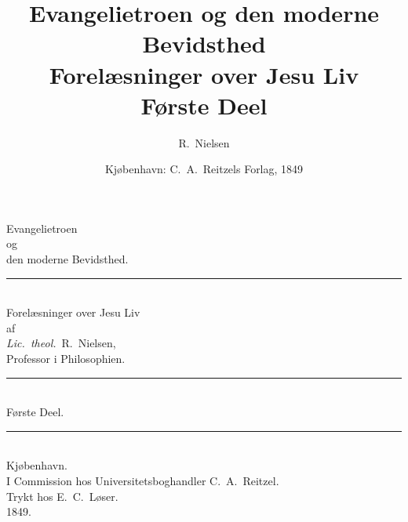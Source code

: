 \documentclass[12pt,a4paper]{book}
\title{\textbf{Evangelietroen og den moderne Bevidsthed}\\[6pt]
  \large Forelæsninger over Jesu Liv\\[4pt]
  \large Første Deel}
\author{R.\ Nielsen}
\date{Kjøbenhavn: C.\ A.\ Reitzels Forlag, 1849}
\begin{document}
\maketitle
\thispagestyle{empty}
\newpage

\tableofcontents
\newpage



\begin{center}
  {\LARGE Evangelietroen}\\[10pt]
  og\\[10pt]
  {\LARGE den moderne Bevidsthed.}\\[12pt]
  \rule{0.28\textwidth}{0.4pt}\\[14pt]
  {\large Forelæsninger over Jesu Liv}\\[10pt]
  af\\[10pt]
  {\large \textit{Lic.\ theol.}\ R.\ Nielsen,}\\[2pt]
  {\footnotesize Professor i Philosophien.}\\[12pt]
  \rule{0.28\textwidth}{0.4pt}\\[16pt]
  {\large Første Deel.}\\[16pt]
  \rule{0.62\textwidth}{0.4pt}\\[16pt]
  {\large Kjøbenhavn.}\\[4pt]
  I Commission hos Universitetsboghandler C.\ A.\ Reitzel.\\[4pt]
  Trykt hos E.\ C.\ Løser.\\[6pt]
  {\large 1849.}
\end{center}
\end{document}
